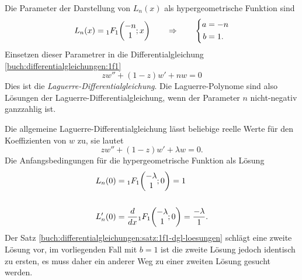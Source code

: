 Die Parameter der Darstellung von $L_n(x)$ als hypergeometrische
Funktion sind
\[
L_n(x) = \mathstrut_1F_1\biggl(
\begin{matrix}-n\\1\end{matrix}
;x
\biggr)
\qquad\Rightarrow\qquad
\left\{
\begin{aligned}
a&=-n\\
b&=1.
\end{aligned}
\right.
\]
Einsetzen dieser Parametrer in die Differentialgleichung
\eqref{buch:differentialgleichungen:1f1}
\begin{equation}
zw'' + (1-z)w'+nw=0
\label{buch:differentialgleichungen:eqn:laguerre-dgl}
\end{equation}
Dies ist die {\em Laguerre-Differentialgleichung}.
%
%
Die Laguerre-Polynome sind also Lösungen der Laguerre-Differentialgleichung,
wenn der Parameter $n$ nicht-negativ ganzzahlig ist.

Die allgemeine Laguerre-Differentialgleichung lässt beliebige reelle
Werte für den Koeffizienten von $w$ zu, sie lautet
\[
zw''+(1-z)w'+\lambda w=0.
\]
Die Anfangsbedingungen für die hypergeometrische Funktion als Lösung 
\begin{align*}
L_n(0)  &= \mathstrut_1F_1\biggl(\begin{matrix}-\lambda\\1\end{matrix}; 0\biggr) = 1\\
\\
L'_n(0) &=
\frac{d}{dx}
\mathstrut_1F_1\biggl(\begin{matrix}-\lambda\\1\end{matrix};0\biggr)
=
\frac{-\lambda}{1}.
\end{align*}
Der Satz
\ref{buch:differentialgleichungen:satz:1f1-dgl-loesungen}
schlägt eine zweite Lösung vor, im vorliegenden Fall mit $b=1$
ist die zweite Lösung jedoch identisch zu ersten, es muss daher
ein anderer Weg zu einer zweiten Lösung gesucht werden.


%
%
%
